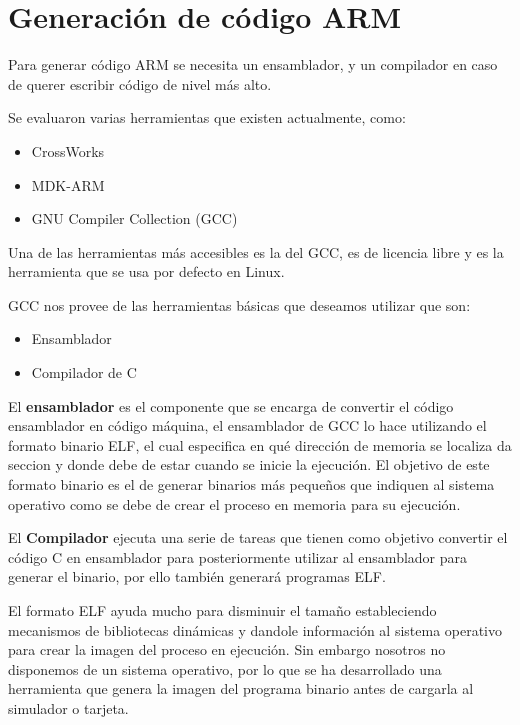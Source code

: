 \section{Generaci\'on de c\'odigo ARM}

Para generar c\'odigo ARM se necesita un ensamblador, y un compilador en caso de querer escribir c\'odigo de nivel m\'as alto.

Se evaluaron varias herramientas que existen actualmente, como:

\begin{itemize}
\item CrossWorks
\item MDK-ARM
\item GNU Compiler Collection (GCC)
\end{itemize}

Una de las herramientas m\'as accesibles es la del GCC, es de licencia libre y es la herramienta que se usa por defecto en Linux.

GCC nos provee de las herramientas b\'asicas que deseamos utilizar que son:

\begin{itemize}

\item Ensamblador
\item Compilador de C

\end{itemize}

El \textbf{ensamblador} es el componente que se encarga de convertir el c\'odigo ensamblador en c\'odigo m\'aquina, el ensamblador de GCC lo hace utilizando el formato binario ELF, el cual especifica en qu\'e direcci\'on de memoria se localiza da seccion y donde debe de estar cuando se inicie la ejecuci\'on. El objetivo de este formato binario es el de generar binarios m\'as peque\~nos que indiquen al sistema operativo como se debe de crear el proceso en memoria para su ejecuci\'on.

El \textbf{Compilador} ejecuta una serie de tareas que tienen como objetivo convertir el c\'odigo C en ensamblador para posteriormente utilizar al ensamblador para generar el binario, por ello tambi\'en generar\'a programas ELF.

El formato ELF ayuda mucho para disminuir el tama\~no estableciendo mecanismos de bibliotecas din\'amicas y dandole informaci\'on al sistema operativo para crear la imagen del proceso en ejecuci\'on. Sin embargo nosotros no disponemos de un sistema operativo, por lo que se ha desarrollado una herramienta que genera la imagen del programa binario antes de cargarla al simulador o tarjeta.

